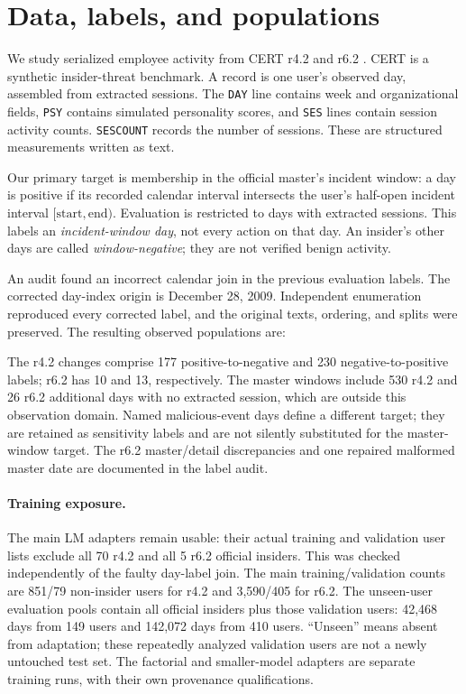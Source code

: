 \section{Data, labels, and populations}
\label{sec:data}
We study serialized employee activity from CERT r4.2 and r6.2
\citep{certdataset,glasser2013bridging,le2020analyzing}. CERT is a synthetic
insider-threat benchmark. A record is one user's observed day, assembled from
extracted sessions. The \texttt{DAY} line contains week and organizational
fields, \texttt{PSY} contains simulated personality scores, and \texttt{SES}
lines contain session activity counts. \texttt{SESCOUNT} records the number of
sessions. These are structured measurements written as text.

Our primary target is membership in the official master's incident window:
a day is positive if its recorded calendar interval intersects the user's
half-open incident interval $[\mathrm{start},\mathrm{end})$. Evaluation is
restricted to days with extracted sessions. This labels an \emph{incident-window
day}, not every action on that day. An insider's other days are called
\emph{window-negative}; they are not verified benign activity.

An audit found an incorrect calendar join in the previous evaluation labels.
The corrected day-index origin is December 28, 2009. Independent enumeration
reproduced every corrected label, and the original texts, ordering, and splits
were preserved. The resulting observed populations are:
\begin{center}\end{center}
The r4.2 changes comprise 177 positive-to-negative and 230 negative-to-positive
labels; r6.2 has 10 and 13, respectively. The master windows include 530 r4.2
and 26 r6.2 additional days with no extracted session, which are outside this
observation domain. Named malicious-event days define a different target; they
are retained as sensitivity labels and are not silently substituted for the
master-window target. The r6.2 master/detail discrepancies and one repaired
malformed master date are documented in the label audit.

\paragraph{Training exposure.}
The main LM adapters remain usable: their actual training and validation
user lists exclude all 70 r4.2 and all 5 r6.2 official insiders. This was
checked independently of the faulty day-label join. The main training/validation
counts are 851/79 non-insider users for r4.2 and 3,590/405 for r6.2. The
unseen-user evaluation pools contain all official insiders plus those validation
users: 42,468 days from 149 users and 142,072 days from 410 users.
``Unseen'' means absent from adaptation; these repeatedly analyzed validation
users are not a newly untouched test set. The factorial and smaller-model
adapters are separate training runs, with their own provenance qualifications.

